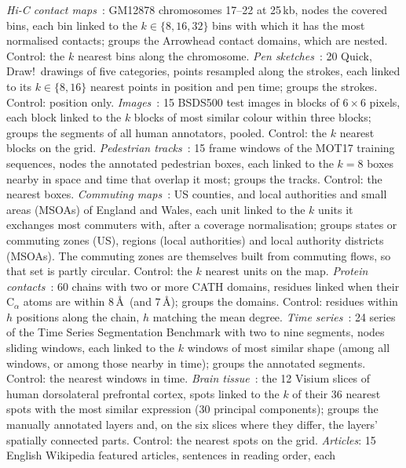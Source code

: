 \emph{Hi-C contact maps}~\cite{rao2014hic}: GM12878 chromosomes 17--22 at 25\,kb,
nodes the covered bins, each bin linked to the $k\in\{8,16,32\}$ bins with which it has
the most normalised contacts; groups the Arrowhead contact domains, which are nested.
Control: the $k$ nearest bins along the chromosome.
\emph{Pen sketches}~\cite{ha2018sketch}: 20 Quick, Draw!\ drawings of five categories,
points resampled along the strokes, each linked to its $k\in\{8,16\}$ nearest points in
position and pen time; groups the strokes. Control: position only.
\emph{Images}~\cite{martin2001database,arbelaez2011contour}: 15 BSDS500 test images in
blocks of $6\times6$ pixels, each block linked to the $k$ blocks of most similar colour
within three blocks; groups the segments of all human annotators, pooled. Control: the
$k$ nearest blocks on the grid.
\emph{Pedestrian tracks}~\cite{milan2016mot16}: 15 frame windows of the MOT17 training
sequences, nodes the annotated pedestrian boxes, each linked to the $k=8$ boxes nearby
in space and time that overlap it most; groups the tracks. Control: the nearest boxes.
\emph{Commuting maps}~\cite{census_commuting,ons_odwp01ew}: US counties, and local
authorities and small areas (MSOAs) of England and Wales, each unit linked to the $k$
units it exchanges most commuters with, after a coverage normalisation; groups states
or commuting zones (US), regions (local authorities) and local authority districts
(MSOAs). The commuting zones are themselves built from commuting flows, so that set is
partly circular. Control: the $k$ nearest units on the map.
\emph{Protein contacts}~\cite{sillitoe2021cath}: 60 chains with two or more CATH
domains, residues linked when their C$_\alpha$ atoms are within $8$\,\AA\ (and
$7$\,\AA); groups the domains. Control: residues within $h$ positions along the chain,
$h$ matching the mean degree.
\emph{Time series}~\cite{ermshaus2023clasp}: 24 series of the Time Series Segmentation
Benchmark with two to nine segments, nodes sliding windows, each linked to the $k$
windows of most similar shape (among all windows, or among those nearby in time);
groups the annotated segments. Control: the nearest windows in time.
\emph{Brain tissue}~\cite{maynard2021transcriptome}: the 12 Visium slices of human
dorsolateral prefrontal cortex, spots linked to the $k$ of their 36 nearest spots with
the most similar expression (30 principal components); groups the manually annotated
layers and, on the six slices where they differ, the layers' spatially connected parts. Control: the nearest spots on the grid.
\emph{Articles}: 15 English Wikipedia featured articles, sentences in reading order, each
